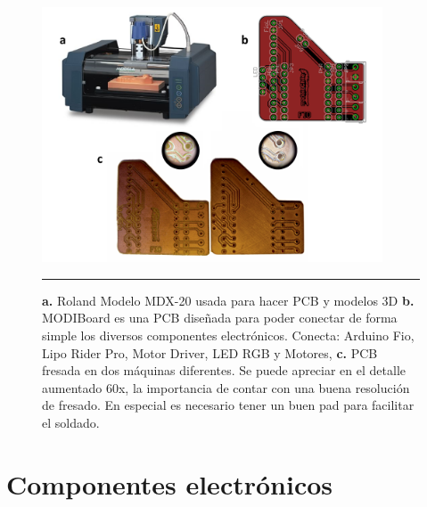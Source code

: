 \begin{figure}[htbp]
	\centering
		\includegraphics[width=0.9\textwidth]{./Figures/modi/pcb.png}
		\rule{35em}{0.5pt}
	\caption[Fabricación de PCB]{\textbf{a.} Roland Modelo MDX-20 usada para hacer PCB y modelos 3D \textbf{b.} MODIBoard es una PCB diseñada para poder conectar de forma simple los diversos componentes electrónicos. Conecta: Arduino Fio, Lipo Rider Pro, Motor Driver, LED RGB y Motores, \textbf{c. }PCB fresada en dos máquinas diferentes. Se puede apreciar en el detalle aumentado 60x, la importancia de contar con una buena resolución de fresado. En especial es necesario tener un buen pad para facilitar el soldado.}
	\label{fig:pcb}
\end{figure}


\section{Componentes electrónicos}

